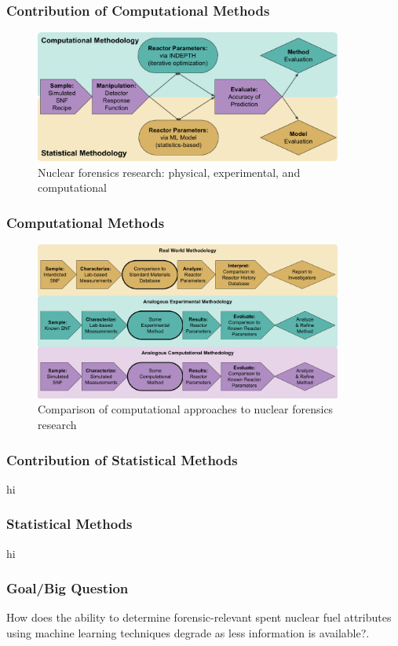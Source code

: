 
\begin{frame}
  \frametitle{Contribution of Computational Methods}
  \begin{figure}[h!]
    \centering
    \includegraphics[width=0.9\textwidth]{CompStatForensicsWorkflow.png}
    \caption{Nuclear forensics research: physical, experimental, and computational}
  \end{figure}
\end{frame}

\begin{frame}
  \frametitle{Computational Methods}
  \begin{figure}[h!]
    \centering
    \includegraphics[width=0.9\textwidth]{ForensicsWorkflows.png}
    \caption{Comparison of computational approaches to nuclear forensics research}
  \end{figure}
\end{frame}

\begin{frame}
  \frametitle{Contribution of Statistical Methods}
  hi
\end{frame}

\begin{frame}
  \frametitle{Statistical Methods}
  hi
\end{frame}

\begin{frame}
  \frametitle{Goal/Big Question}
  How does the ability to determine forensic-relevant spent nuclear fuel
  attributes using machine learning techniques degrade as less information is
  available?.
\end{frame}
